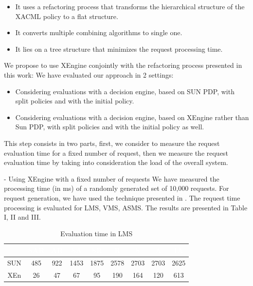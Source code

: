 \begin{itemize}
\item It uses a refactoring process that transforms the hierarchical structure of the XACML policy to a flat structure. 
\item It converts multiple combining algorithms to single one.
\item It lies on a tree structure that minimizes the request processing time.
\end{itemize}
We propose to use XEngine conjointly with the refactoring process presented in this work:
We have evaluated our approach in 2 settings:
\begin{itemize}
\item Considering evaluations with a decision engine, based on SUN PDP, with split policies and with the initial policy.  
\item Considering evaluations with a decision engine, based on XEngine rather than Sun PDP, with split policies and with the initial policy as well.  
\end{itemize}

This step consists in two parts, first, we consider to measure the request evaluation time for a fixed number of request, then we measure the request evaluation
 time by taking into consideration the load of the overall system.


- Using XEngine with a fixed number of requests
We have measured the processing time (in ms) of a randomly generated set of 10,000 requests. For request generation, we have used the technique presented 
in \cite{request}. The request time processing is evaluated for LMS, VMS, ASMS. The results are presented in Table I, II and III.

\begin{table}[h!]
\centering
\begin{tabular}{|>{\tiny}c|>{\tiny}c|>{\tiny}c|>{\tiny}c|>{\tiny}c|>{\tiny}c|>{\tiny}c|>{\tiny}c|>{\tiny}c|}   
\hline  \rowcolor{black} \scriptsize \bf \textcolor {white}{}
& \scriptsize \bf \textcolor {white}{SAR}
& \scriptsize \bf \textcolor {white}{AR}
& \scriptsize \bf \textcolor  {white}{SA}
& \scriptsize \bf \textcolor  {white}{SR}
& \scriptsize \bf \textcolor  {white}{R}

& \scriptsize \bf \textcolor  {white}{S} 
& \scriptsize \bf \textcolor  {white}{A}
& \scriptsize \bf \textcolor {white}{IA}\\ \hline
\scriptsize  {SUN }
&\scriptsize  {485}
& \scriptsize {922}
& \scriptsize {1453}
& \scriptsize {1875}
& \scriptsize {2578}

& \scriptsize {2703}
& \scriptsize {2703}
& \scriptsize {2625}
  \\ \hline
\scriptsize  {XEn}
&\scriptsize  {26}
& \scriptsize {47}
& \scriptsize {67}
& \scriptsize {95}
& \scriptsize {190}

& \scriptsize {164}
& \scriptsize {120}
& \scriptsize {613}
  \\ \hline
\end{tabular}
\caption{Evaluation time in LMS}\end{table}



